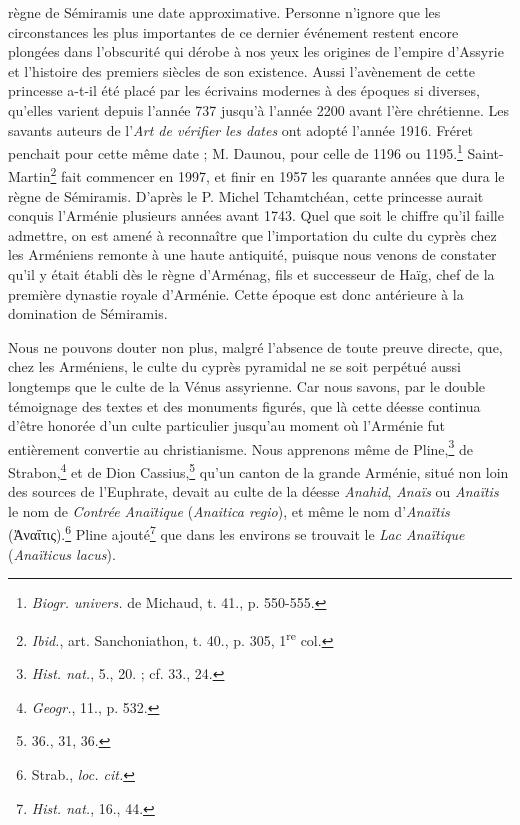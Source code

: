\documentclass[a4paper, 11pt, oneside, polutonikogreek, french]{article}
\begin{document}
règne de Sémiramis une date approximative. Personne n'ignore que les circonstances les plus importantes de ce dernier événement restent encore plongées dans l'obscurité qui dérobe à nos yeux les origines de l'empire d'Assyrie et l'histoire des premiers siècles de son existence. Aussi l'avènement de cette princesse a-t-il été placé par les écrivains modernes à des époques si diverses, qu'elles varient depuis l'année 737 jusqu'à l'année 2200 avant l'ère chrétienne. Les savants auteurs de l'\emph{Art de vérifier les dates} ont adopté l'année 1916. Fréret penchait pour cette même date ; M. Daunou, pour celle de 1196 ou 1195.\footnote{\emph{Biogr. univers.} de Michaud, t. 41., p. 550-555.} Saint-Martin\footnote{\emph{Ibid.}, art. Sanchoniathon, t. 40., p. 305, 1\textsuperscript{re} col.} fait commencer en 1997, et finir en 1957 les quarante années que dura le règne de Sémiramis. D'après le P. Michel Tchamtchéan, cette princesse aurait conquis l'Arménie plusieurs années avant 1743. Quel que soit le chiffre qu'il faille admettre, on est amené à reconnaître que l'importation du culte du cyprès chez les Arméniens remonte à une haute antiquité, puisque nous venons de constater qu'il y était établi dès le règne d'Arménag, fils et successeur de Haïg, chef de la première dynastie royale d'Arménie. Cette époque est donc antérieure à la domination de Sémiramis.

Nous ne pouvons douter non plus, malgré l'absence de toute preuve directe, que, chez les Arméniens, le culte du cyprès pyramidal ne se soit perpétué aussi longtemps que le culte de la Vénus assyrienne. Car nous savons, par le double témoignage des textes et des monuments figurés, que là cette déesse continua d'être honorée d'un culte particulier jusqu'au moment où l'Arménie fut entièrement convertie au christianisme. Nous apprenons même de Pline,\footnote{\emph{Hist. nat.}, 5., 20. ; cf. 33., 24.} de Strabon,\footnote{\emph{Geogr.}, 11., p. 532.} et de Dion Cassius,\footnote{36., 31, 36.} qu'un canton de la grande Arménie, situé non loin des sources de l'Euphrate, devait au culte de la déesse \emph{Anahid}, \emph{Anaïs} ou \emph{Anaïtis} le nom de \emph{Contrée Anaïtique} (\emph{Anaitica regio}), et même le nom d'\emph{Anaïtis} (Ἀναΐτις).\footnote{Strab., \emph{loc. cit.}} Pline ajouté\footnote{\emph{Hist. nat.}, 16., 44.} que dans les environs se trouvait le \emph{Lac Anaïtique} (\emph{Anaïticus lacus}).
\end{document}
